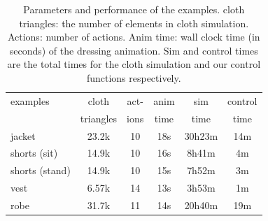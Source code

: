 \begin{table}
  \centering
  \begin{tabular}{|l|c|c|c|c|c|}
    \hline
    examples 		& cloth 	& act- 	& anim	& sim 		& control \\
                        & triangles & 	ions	& time 	& time 		& time \\
    \hline
    jacket 		& 23.2k  	& 10		& 18s 	&30h23m	&  14m  \\
    shorts (sit) 	& 14.9k 	& 10		& 16s 	&  8h41m 	& 4m \\
    shorts (stand)	& 14.9k 	& 10		& 15s	&  7h52m	& 3m \\
    vest 		& 6.57k		& 14		& 13s	&  3h53m	& 1m   \\
    robe 		& 31.7k 	& 11		& 14s			& 20h40m		& 19m  \\
    \hline
  \end{tabular}
  \caption{Parameters and performance of the examples. cloth triangles: the number of elements in cloth simulation. Actions: number of actions. Anim time: wall clock time (in seconds) of the dressing animation. Sim and control times are the total times for the cloth simulation and our control functions respectively.}
  \label{table:data}
\end{table}

